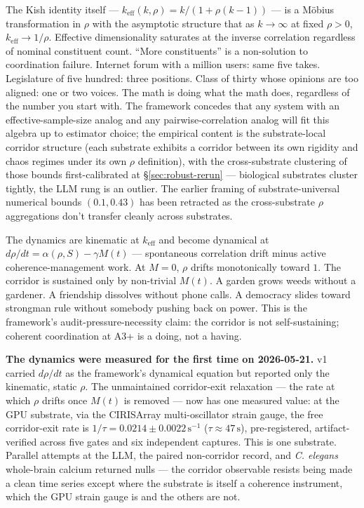 \documentclass[11pt,a4paper]{article}
\newcommand{\keff}{k_{\text{eff}}}
\begin{document}
The Kish identity itself --- $\keff(k, \rho) = k / (1 + \rho(k-1))$ --- is a M\"obius transformation in $\rho$ with the asymptotic structure that as $k \to \infty$ at fixed $\rho > 0$, $\keff \to 1/\rho$. Effective dimensionality saturates at the inverse correlation regardless of nominal constituent count. ``More constituents'' is a non-solution to coordination failure. Internet forum with a million users: same five takes. Legislature of five hundred: three positions. Class of thirty whose opinions are too aligned: one or two voices. The math is doing what the math does, regardless of the number you start with. The framework concedes that any system with an effective-sample-size analog and any pairwise-correlation analog will fit this algebra up to estimator choice; the empirical content is the substrate-local corridor structure (each substrate exhibits a corridor between its own rigidity and chaos regimes under its own $\rho$ definition), with the cross-substrate clustering of those bounds first-calibrated at \S\ref{sec:robust-rerun} --- biological substrates cluster tightly, the LLM rung is an outlier. The earlier framing of substrate-universal numerical bounds $(0.1, 0.43)$ has been retracted as the cross-substrate $\rho$ aggregations don't transfer cleanly across substrates.

The dynamics are kinematic at $\keff$ and become dynamical at $d\rho/dt = \alpha(\rho, S) - \gamma M(t)$ --- spontaneous correlation drift minus active coherence-management work. At $M = 0$, $\rho$ drifts monotonically toward $1$. The corridor is sustained only by non-trivial $M(t)$. A garden grows weeds without a gardener. A friendship dissolves without phone calls. A democracy slides toward strongman rule without somebody pushing back on power. This is the framework's audit-pressure-necessity claim: the corridor is not self-sustaining; coherent coordination at A3+ is a doing, not a having.

\textbf{The dynamics were measured for the first time on 2026-05-21.} v1 carried $d\rho/dt$ as the framework's dynamical equation but reported only the kinematic, static $\rho$. The unmaintained corridor-exit relaxation --- the rate at which $\rho$ drifts once $M(t)$ is removed --- now has one measured value: at the GPU substrate, via the CIRISArray multi-oscillator strain gauge, the free corridor-exit rate is $1/\tau = 0.0214 \pm 0.0022\,\mathrm{s}^{-1}$ ($\tau \approx 47\,\mathrm{s}$), pre-registered, artifact-verified across five gates and six independent captures. This is one substrate. Parallel attempts at the LLM, the paired non-corridor record, and \emph{C. elegans} whole-brain calcium returned nulls --- the corridor observable resists being made a clean time series except where the substrate is itself a coherence instrument, which the GPU strain gauge is and the others are not.
\end{document}
